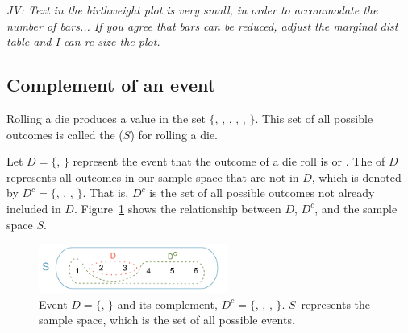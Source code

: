 \textit{JV: Text in the birthweight plot is very small, in order to accommodate the number of bars... If you agree that bars can be reduced, adjust the marginal dist table and I can re-size the plot.}

\newpage
\subsection{Complement of an event}

Rolling a die produces a value in the set $\{$, , , , , $\}$. This set of all possible outcomes is called the  ($S$) for rolling a die. 

Let $D=\{$, $\}$ represent the event that the outcome of a die roll is  or . The  of $D$ represents all outcomes in our sample space that are not in $D$, which is denoted by $D^c = \{$, , , $\}$. That is, $D^c$ is the set of all possible outcomes not already included in $D$. Figure~\ref{fig:complementOfD} shows the relationship between $D$, $D^c$, and the sample space $S$. 

\begin{figure}[hht]
\centering
\includegraphics[width=0.55\textwidth]{ch_probability_oi_biostat/figures/complementOfD/complementOfD}
\caption{Event $D=\{$, $\}$ and its complement, $D^c = \{$, , , $\}$. $S$~represents the sample space, which is the set of all possible events.}
\label{fig:complementOfD}
\end{figure}

